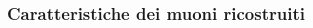 \documentclass{beamer}
\begin{document}



\begin{frame}
\frametitle{Caratteristiche dei muoni ricostruiti}

\begin{columns}
\begin{column}{.09\textwidth}
\end{column}
\begin{column}{.41\textwidth}
\centering
{}
\end{column}
\begin{column}{.41\textwidth}
\centering
{}
\end{column}
\begin{column}{.09\textwidth}
\end{column}
\end{columns}

\begin{columns}
\begin{column}{.09\textwidth}
\end{column}
\begin{column}{.41\textwidth}
\centering
{}
\end{column}
\begin{column}{.41\textwidth}
\centering
{}
\end{column}
\begin{column}{.09\textwidth}
\end{column}
\end{columns}


\end{frame}
\end{document}
